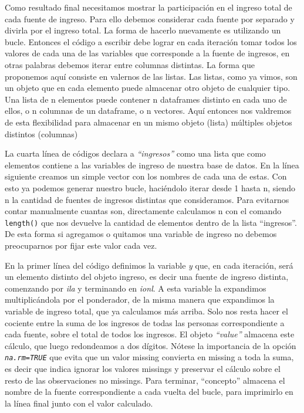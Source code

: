 \documentclass[
]{book}
\begin{document}
Como resultado final necesitamos mostrar la participación en el ingreso total de cada fuente de ingreso. Para ello debemos considerar cada fuente por separado y divirla por el ingreso total. La forma de hacerlo nuevamente es utilizando un bucle. Entonces el código a escribir debe lograr en cada iteración tomar todos los valores de cada una de las variables que corresponde a la fuente de ingresos, en otras palabras debemos iterar entre columnas distintas. La forma que proponemos aquí consiste en valernos de las listas. Las listas, como ya vimos, son un objeto que en cada elemento puede almacenar otro objeto de cualquier tipo. Una lista de n elementos puede contener n dataframes distinto en cada uno de ellos, o n columnas de un dataframe, o n vectores. Aquí entonces nos valdremos de esta flexibilidad para almacenar en un mismo objeto (lista) múltiples objetos distintos (columnas)

La cuarta línea de códigos declara a \emph{``ingresos''} como una lista que como elementos contiene a las variables de ingreso de nuestra base de datos. En la línea siguiente creamos un simple vector con los nombres de cada una de estas. Con esto ya podemos generar nuestro bucle, haciéndolo iterar desde 1 hasta n, siendo n la cantidad de fuentes de ingresos distintas que consideramos. Para evitarnos contar manualmente cuantas son, directamente calculamos n con el comando \texttt{length()} que nos devuelve la cantidad de elementos dentro de la lista ``ingresos''. De esta forma si agregamos o quitamos una variable de ingreso no debemos preocuparnos por fijar este valor cada vez.

En la primer línea del código definimos la variable \emph{y} que, en cada iteración, será un elemento distinto del objeto ingreso, es decir una fuente de ingreso distinta, comenzando por \emph{ila} y terminando en \emph{ionl}. A esta variable la expandimos multiplicándola por el ponderador, de la misma manera que expandimos la variable de ingreso total, que ya calculamos más arriba. Solo nos resta hacer el cociente entre la suma de los ingresos de todas las personas correspondiente a cada fuente, sobre el total de todos los ingresos. El objeto \emph{``value''} almacena este cálculo, que luego redondeamos a dos dígitos. Nótese la importancia de la opción \emph{\texttt{na.rm=TRUE}} que evita que un valor missing convierta en missing a toda la suma, es decir que indica ignorar los valores missings y preservar el cálculo sobre el resto de las observaciones no missings. Para terminar, ``concepto'' almacena el nombre de la fuente correspondiente a cada vuelta del bucle, para imprimirlo en la línea final junto con el valor calculado.
\end{document}
